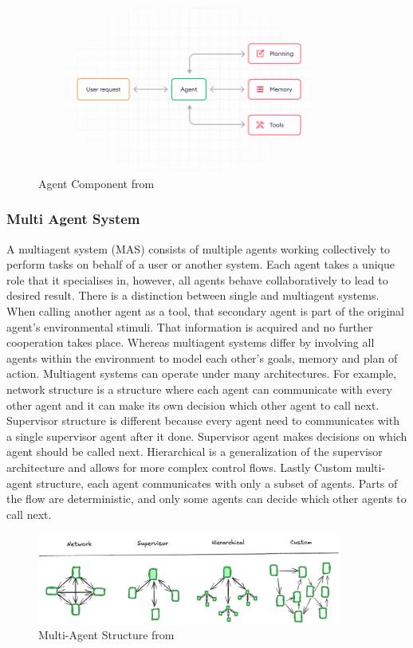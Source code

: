     \cite{SuperAnnotate}
    \begin{figure}[H]
        \centering
        \includegraphics[width=10cm]{chapters/2/figures/agent.png}
        \caption[Agent Component]{Agent Component  from~\cite{SuperAnnotate}}
        \label{fig:agent-component}
    \end{figure}

        \subsubsection{Multi Agent System}
        A multiagent system (MAS) consists of multiple agents working collectively to perform tasks on behalf of a user or another system. Each agent takes a unique role that it specialises in, however, all agents behave collaboratively to lead to desired result. There is a distinction between single and multiagent systems. When calling another agent as a tool, that secondary agent is part of the original agent's environmental stimuli. That information is acquired and no further cooperation takes place. Whereas multiagent systems differ by involving all agents within the environment to model each other's goals, memory and plan of action. Multiagent systems can operate under many architectures. For example, network structure is a structure where each agent can communicate with every other agent and it can make its own decision which other agent to call next. Supervisor structure is different because every agent need to communicates with a single supervisor agent after it done. Supervisor agent makes decisions on which agent should be called next. Hierarchical is a generalization of the supervisor architecture and allows for more complex control flows. Lastly Custom multi-agent structure, each agent communicates with only a subset of agents. Parts of the flow are deterministic, and only some agents can decide which other agents to call next.
        \cite{Gutowska} \cite{LangGraph}
        \begin{figure}[H]
            \centering
            \includegraphics[width=10cm]{chapters/2/figures/multi-agent.png}
            \caption[Multi-Agent Structure]{Multi-Agent Structure  from~\cite{LangGraph}}
            \label{fig:multi-agent}
        \end{figure}

